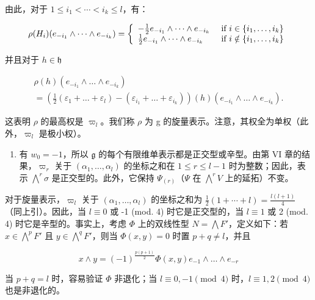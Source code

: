 由此，对于 \(1 \leq i_{1} < \cdots < i_{k} \leq l\)，有：

\[
\rho (H _ {i}) (e _ {- i _ {1}} \wedge \dots \wedge e _ {- i _ {k}}) = \left\{ \begin{array}{l l} - \frac {1}{2} e _ {- i _ {1}} \wedge \dots \wedge e _ {- i _ {k}} & \text { if } i \in \{i _ {1}, \ldots , i _ {k} \} \\ \frac {1}{2} e _ {- i _ {1}} \wedge \dots \wedge e _ {- i _ {k}} & \text { if } i \notin \{i _ {1}, \ldots , i _ {k} \} \end{array} \right.
\]

并且对于 \(h\in \mathfrak{h}\)

\[
\begin{array}{l} \rho (h) (e _ {- i _ {1}} \wedge \dots \wedge e _ {- i _ {k}}) \\ = (\frac {1}{2} (\varepsilon_ {1} + \dots + \varepsilon_ {l}) - (\varepsilon_ {i _ {1}} + \dots + \varepsilon_ {i _ {k}})) (h) (e _ {- i _ {1}} \wedge \dots \wedge e _ {- i _ {k}}). \end{array} \tag {5}
\]

这表明 \(\rho\) 的最高权是 \(\varpi_{l}\)。我们称 \(\rho\) 为 g 的旋量表示。注意，其权全为单权（此外，\(\varpi_{l}\) 是极小权）。

\begin{enumerate}
\def\labelenumi{(\Alph{enumi})}
\setcounter{enumi}{21}
\tightlist
\item
有 \(w_0 = -1\)，所以 \(\mathfrak{g}\) 的每个有限维单表示都是正交型或辛型。由第 VI 章的结果，\(\varpi_r\) 关于 \((\alpha_1, \ldots, \alpha_l)\) 的坐标之和在 \(1 \leq r \leq l - 1\) 时为整数；因此，表示 \(\bigwedge^r \sigma\) 是正交型的。此外，它保持 \(\Psi_{(r)}\)（\(\Psi\) 在 \(\bigwedge^r V\) 上的延拓）不变。
\end{enumerate}

对于旋量表示，\(\varpi_{l}\) 关于 \((\alpha_{1},\ldots,\alpha_{l})\) 的坐标之和为 \(\frac{1}{2}(1+\cdots+l)=\frac{l(l+1)}{4}\)（同上引）。因此，当 \(l\equiv0\) 或 -1 (mod. 4) 时它是正交型的，当 \(l\equiv1\) 或 2 (mod. 4) 时它是辛型的。事实上，考虑 \(\Phi\) 上的双线性型 \(N=\bigwedge F'\)，定义如下：若 \(x\in\bigwedge^{p}F'\) 且 \(y\in\bigwedge^{q}F'\)，则当 \(\Phi(x,y)=0\) 时置 \(p+q\neq l\)，并且

\[
x \wedge y = (- 1) ^ {\frac {p (p + 1)}{2}} \varPhi (x, y) e _ {- 1} \wedge \dots \wedge e _ {- r}
\]

当 \(p + q = l\) 时，容易验证 \(\Phi\) 非退化；当 \(l \equiv 0, -1 \pmod{4}\) 时，\(l \equiv 1, 2 \pmod{4}\) 也是非退化的。

